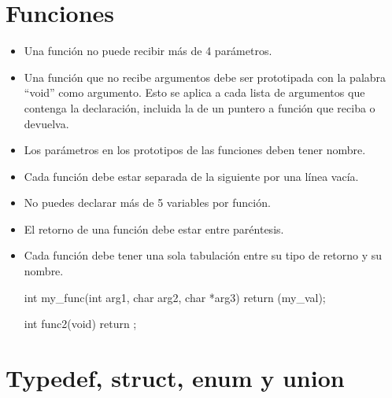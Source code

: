 \documentclass{42-es}
\begin{document}
\section{Funciones}

\begin{itemize}

      \item Una función no puede recibir más de 4 parámetros.
      \item Una función que no recibe argumentos debe ser prototipada con la
            palabra ``void'' como argumento. Esto se aplica a cada lista de
            argumentos que contenga la declaración, incluida la de un puntero a
            función que reciba o devuelva.
      \item Los parámetros en los prototipos de las funciones deben tener
            nombre.
      \item Cada función debe estar separada de la siguiente por una línea
            vacía.
      \item No puedes declarar más de 5 variables por función.
      \item El retorno de una función debe estar entre paréntesis.
      \item Cada función debe tener una sola tabulación entre su tipo de
            retorno
            y
            su nombre.

            \begin{42ccode}
                  int my_func(int arg1, char arg2, char *arg3)
                  {
                              return (my_val);
                        }

                  int func2(void)
                  {
                              return ;
                        }
            \end{42ccode}
\end{itemize}
\newpage

\section{Typedef, struct, enum y union}
\end{document}
